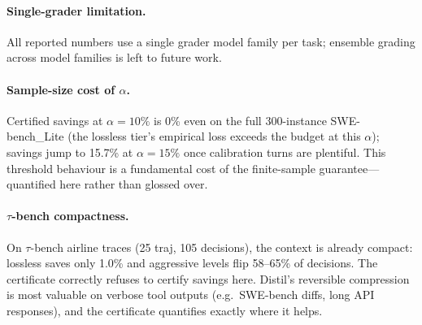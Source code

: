 \documentclass{article}
\begin{document}
\paragraph{Single-grader limitation.} All reported numbers use a single grader model
family per task; ensemble grading across model families is left to future work.

\paragraph{Sample-size cost of $\alpha$.} Certified savings at $\alpha=10\%$ is 0\%
even on the full 300-instance SWE-bench\_Lite (the lossless tier's empirical loss
exceeds the budget at this $\alpha$); savings jump to 15.7\% at $\alpha=15\%$ once
calibration turns are plentiful. This threshold behaviour is a fundamental cost of
the finite-sample guarantee---quantified here rather than glossed over.

\paragraph{$\tau$-bench compactness.} On $\tau$-bench airline traces (25 traj, 105
decisions), the context is already compact: lossless saves only 1.0\% and aggressive
levels flip 58--65\% of decisions. The certificate correctly refuses to certify
savings here. Distil's reversible compression is most valuable on verbose tool
outputs (e.g.\ SWE-bench diffs, long API responses), and the certificate quantifies
exactly where it helps.
\end{document}
